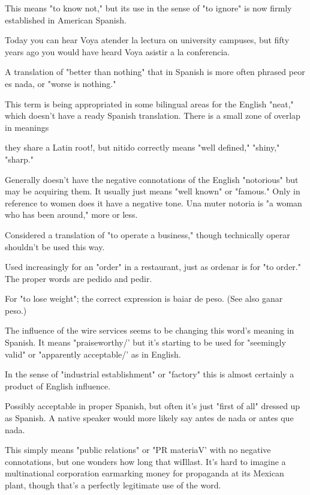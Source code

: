 This means "to know not," but its use in the sense
of "to ignore" is now firmly established in American Spanish.

 Today you can hear Voya atender la lectura on
university campuses, but fifty years ago you would have heard Voya
asistir a la conferencia.

 A translation of "better than nothing"
that in Spanish is more often phrased peor es nada, or "worse is
nothing."

 This term is being appropriated in some bilingual
areas for the English "neat," which doesn't have a ready Spanish translation. There is a small zone of overlap in meanings {they share a Latin
root!, but nitido correctly means "well defined," "shiny," "sharp."

 Generally doesn't have the negative connotations
of the English "notorious" but may be acquiring them. It usually just
means "well known" or "famous." Only in reference to women does it
have a negative tone. Una muter notoria is "a woman who has been
around," more or less.

 Considered a translation of "to operate a business," though technically operar shouldn't be used this way.

 Used increasingly for an "order" in a restaurant, just
as ordenar is for "to order." The proper words are pedido and pedir.

 For "to lose weight"; the correct expression is
baiar de peso. (See also ganar peso.)

 The influence of the wire services seems to be
changing this word's meaning in Spanish. It means "praiseworthy/' but
it's starting to be used for "seemingly valid" or "apparently acceptable/' as in English.

 In the sense of "industrial establishment" or "factory" this is almost certainly a product of English influence.

 Possibly acceptable in proper Spanish,
but often it's just "first of all" dressed up as Spanish. A native speaker
would more likely say antes de nada or antes que nada.

 This simply means "public relations" or "PR
materiaV' with no negative connotations, but one wonders how long
that wiIllast. It's hard to imagine a multinational corporation earmarking money for propaganda at its Mexican plant, though that's
a perfectly legitimate use of the word.

}
